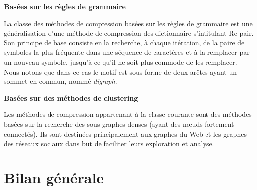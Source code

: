 \documentclass[a4paper,oneside,12pt]{report}
\theoremstyle{definition}
\begin{document}
						 \textbf{Basées sur les règles de grammaire} 
								
								La classe des méthodes de compression basées sur les règles de grammaire est une généralisation d'une méthode de compression des dictionnaire s'intitulant Re-pair. Son principe de base consiste en la  recherche, à chaque itération, de la paire de symboles la plus fréquente dans une séquence de caractères et à la remplacer par un nouveau symbole, jusqu'à ce qu'il ne soit plus commode de les remplacer. Nous notons que dans ce cas le motif est sous forme de deux arêtes ayant un sommet en commun, nommé \textit{digraph}.
								
								
								
								
							
								
								

								
								
						 \textbf{Basées sur des méthodes de clustering}
						 
						 		Les méthodes de compression appartenant à la classe courante sont des méthodes basées sur la recherche des sous-graphes denses (ayant des nœuds fortement connectés). Ils sont destinées principalement aux graphes du Web et les graphes des réseaux sociaux dans but de faciliter leurs exploration et analyse.
								
								
								
						
												
								
		\section{Bilan générale}
	

\end{document}
